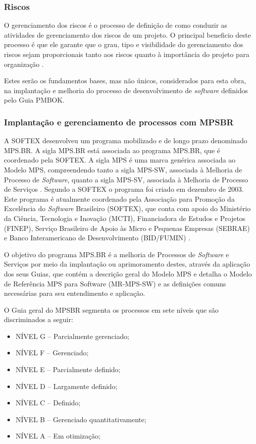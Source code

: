\documentclass{acm_proc_article-sp}
\begin{document}
\subsubsection*{Riscos}
O gerenciamento dos riscos é o processo de definição de como conduzir as atividades de gerenciamento dos riscos de um projeto. O principal beneficio deste processo é que ele garante que o grau, tipo e visibilidade do gerenciamento dos riscos sejam proporcionais tanto aos riscos quanto à importância do projeto para organização \cite{pmbok:nAgil}.

Estes serão os fundamentos bases, mas não únicos, considerados para esta obra, na implantação e melhoria do processo de desenvolvimento de \textit{software} definidos pelo Guia PMBOK. 

\subsubsection{Implantação e gerenciamento de processos com MPSBR}
A SOFTEX desenvolveu um programa mobilizado e de longo prazo denominado MPS.BR. A sigla
MPS.BR está associada ao programa MPS.BR, que é coordenado pela SOFTEX. A sigla MPS é uma
marca genérica associada ao Modelo MPS, compreendendo tanto a sigla MPS-SW, associada à
Melhoria de Processo de \textit{Software}, quanto a sigla MPS-SV, associada à Melhoria de Processo de
Serviços \cite{mpsbr:nAgil}. Segundo a SOFTEX o programa foi criado em dezembro de 2003. Este programa é atualmente coordenado pela Associação para Promoção da Excelência do \textit{Software} Brasileiro (SOFTEX), que conta com apoio do Ministério da Ciência, Tecnologia e Inovação (MCTI), Financiadora de Estudos e Projetos (FINEP), Serviço Brasileiro de Apoio às Micro e Pequenas Empresas (SEBRAE) e Banco Interamericano de Desenvolvimento (BID/FUMIN) \cite{mpsbr:nAgil}.

O objetivo do programa MPS.BR é a melhoria de Processos de \textit{Software} e Serviços por meio da implantação ou aprimoramento destes, através da aplicação dos seus Guias, que contém a descrição geral do Modelo MPS e detalha o Modelo
de Referência MPS para Software (MR-MPS-SW) e as definições comuns necessárias para seu entendimento e aplicação. 

O Guia geral do MPSBR segmenta os processos em sete níveis que são discriminados a seguir:

\begin{itemize}
\item NÍVEL G – Parcialmente gerenciado;
\item NÍVEL F – Gerenciado;
\item NÍVEL E – Parcialmente definido;
\item NÍVEL D – Largamente definido;
\item NÍVEL C – Definido;
\item NÍVEL B – Gerenciado quantitativamente;
\item NÍVEL A – Em otimização;
\end{itemize}
\end{document}
